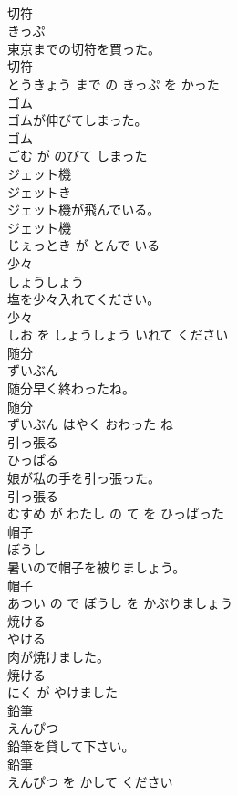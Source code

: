 \documentclass[8pt]{extreport}
\begin{document}
\begin{CJK}{UTF8}{min}
\\	切符	
\\	きっぷ			
\\	東京までの切符を買った。	
\\	切符 
\\	とうきょう まで の きっぷ を かった			
\\	ゴム	
\\	ゴムが伸びてしまった。	
\\	ゴム 
\\	ごむ が のびて しまった			
\\	ジェット機	
\\	ジェットき			
\\	ジェット機が飛んでいる。	
\\	ジェット機 
\\	じぇっとき が とんで いる			
\\	少々	
\\	しょうしょう			
\\	塩を少々入れてください。	
\\	少々 
\\	しお を しょうしょう いれて ください			
\\	随分	
\\	ずいぶん			
\\	随分早く終わったね。	
\\	随分 
\\	ずいぶん はやく おわった ね			
\\	引っ張る	
\\	ひっぱる			
\\	娘が私の手を引っ張った。	
\\	引っ張る 
\\	むすめ が わたし の て を ひっぱった			
\\	帽子	
\\	ぼうし			
\\	暑いので帽子を被りましょう。	
\\	帽子 
\\	あつい の で ぼうし を かぶりましょう			
\\	焼ける	
\\	やける			
\\	肉が焼けました。	
\\	焼ける 
\\	にく が やけました			
\\	鉛筆	
\\	えんぴつ			
\\	鉛筆を貸して下さい。	
\\	鉛筆 
\\	えんぴつ を かして ください			

\end{CJK}
\end{document}
